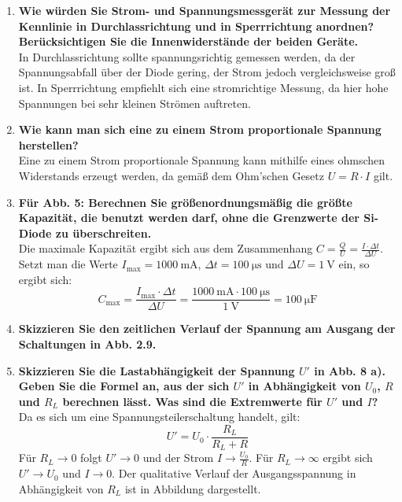\documentclass{article}
\begin{document}
\begin{enumerate}[label=\textbf{(\Alph*)}]
    \item \textbf{Wie würden Sie Strom- und Spannungsmessgerät zur Messung der Kennlinie in Durchlassrichtung und in Sperrrichtung anordnen? Berücksichtigen Sie die Innenwiderstände der beiden Geräte.}
    \\In Durchlassrichtung sollte spannungsrichtig gemessen werden, da der Spannungsabfall über der Diode gering, der Strom jedoch vergleichsweise groß ist. In Sperrrichtung empfiehlt sich eine stromrichtige Messung, da hier hohe Spannungen bei sehr kleinen Strömen auftreten.

    \item \textbf{Wie kann man sich eine zu einem Strom proportionale Spannung herstellen?}
    \\ Eine zu einem Strom proportionale Spannung kann mithilfe eines ohmschen Widerstands erzeugt werden, da gemäß dem Ohm’schen Gesetz \( U = R \cdot I \) gilt.

    \item \textbf{Für Abb. 5: Berechnen Sie größenordnungsmäßig die größte Kapazität, die benutzt werden darf, ohne die Grenzwerte der Si-Diode zu überschreiten.}
    \\ Die maximale Kapazität ergibt sich aus dem Zusammenhang \( C = \frac{Q}{U} = \frac{I \cdot \Delta t}{\Delta U} \).  
    Setzt man die Werte \( I_\text{max} = \SI{1000}{\milli\ampere} \), \( \Delta t = \SI{100}{\micro\second} \) und \( \Delta U = \SI{1}{\volt} \) ein, so ergibt sich:
    \[
    C_\text{max} = \frac{I_\text{max} \cdot \Delta t}{\Delta U} = \frac{\SI{1000}{\milli\ampere} \cdot \SI{100}{\micro\second}}{\SI{1}{\volt}} = \SI{100}{\micro\farad}
    \]
    
    \item \textbf{Skizzieren Sie den zeitlichen Verlauf der Spannung am Ausgang der Schaltungen in Abb. 2.9.}
    
    \item \textbf{Skizzieren Sie die Lastabhängigkeit der Spannung $U'$ in Abb. 8 a). Geben Sie die Formel an, aus der sich $U'$ in Abhängigkeit von $U_0$, $R$ und $R_L$ berechnen lässt. Was sind die Extremwerte für $U'$ und $I$?}
    \\ Da es sich um eine Spannungsteilerschaltung handelt, gilt:
    \[
    U' = U_0 \cdot \frac{R_L}{R_L + R}
    \]
    Für \( R_L \to 0 \) folgt \( U' \to 0 \) und der Strom \( I \to \frac{U_0}{R} \).  
    Für \( R_L \to \infty \) ergibt sich \( U' \to U_0 \) und \( I \to 0 \).  
    Der qualitative Verlauf der Ausgangsspannung in Abhängigkeit von \( R_L \) ist in Abbildung dargestellt.
    

\end{enumerate}
\end{document}
